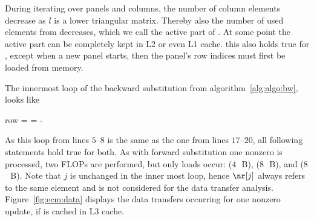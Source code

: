 During iterating over panels and columns, the number of column elements
decrease as $l$ is a lower triangular matrix.
Thereby also the number of used elements from \vr{} decreases, which we call the
active part of \vr{}.
At some point the active part can be completely kept in L2 or even L1 cache.
this also holds true for \vindx{}, except when a new panel starts, then
the panel's row indices must first be loaded from memory.

The innermost loop of the backward substitution from
algorithm~\ref{alg:algo:bw}, looks like 
%
\begin{algorithmic}[1]
\setcounter{ALG@line}{4}
    \State row = \nindx[i++]
    \State \nr[j] = \nr[j] - \nr[row] \nlnz[k]
  \EndFor
\end{algorithmic}
%
As this loop from lines $5$--$8$ is the same as the one from lines $17$--$20$,
all following statements hold true for both. 
%
As with forward substitution one nonzero is processed, two FLOPs are performed,
but only loads occur: \vindx{} ($4$~\,B), \vr{} ($8$~\,B), and \vlnz{} ($8$~\,B).
Note that $j$ is unchanged in the inner most loop, hence $\nr[j]$ always refers
to the same element and is not considered for the data transfer analysis.
%
Figure~\ref{fig:ecm:data} displays the data transfers occurring for one
nonzero update, if \vr{} is cached in L3 cache.

